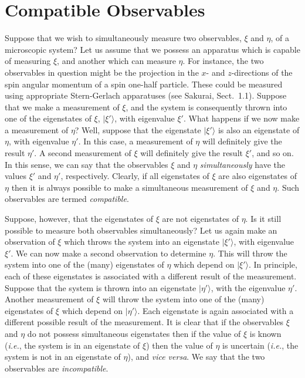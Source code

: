 \section{Compatible Observables}
Suppose that we wish to 
simultaneously measure two observables, $\xi$ and $\eta$, of a
microscopic system? Let us assume that we possess an apparatus which is
capable of measuring $\xi$, and another which can measure $\eta$. For instance,
the two observables in question might be the projection in the
$x$- and $z$-directions of the
spin angular momentum  of a spin one-half particle. These could be measured using
appropriate Stern-Gerlach apparatuses (see Sakurai, Sect.~1.1). 
Suppose that we make a measurement of $\xi$, and the system is 
consequently thrown into
one of the eigenstates of $\xi$, $|\xi'\rangle$, with eigenvalue $\xi'$. What
happens if we now make a measurement of $\eta$?  Well, suppose that
the eigenstate $|\xi'\rangle$ is also an eigenstate of $\eta$, with eigenvalue
$\eta'$. In this case, a measurement of $\eta$ will definitely give the
result $\eta'$. A second measurement of $\xi$ will definitely give the
result $\xi'$, and so on. In this sense, we can say that
the observables $\xi$ and $\eta$
{\em simultaneously} have the values $\xi'$ and $\eta'$, respectively. 
Clearly, if all eigenstates of $\xi$ are also eigenstates of $\eta$ then 
it is always possible to make a simultaneous measurement of $\xi$ and $\eta$.
Such observables are termed {\em compatible}. 

Suppose, however, that the eigenstates of $\xi$ are not eigenstates of $\eta$.
Is it still possible to measure both observables simultaneously? Let us again
make an observation of $\xi$ which throws the system into an eigenstate
$|\xi'\rangle$, with eigenvalue $\xi'$.
 We can now make a second observation to determine $\eta$. 
This will throw the system into one of the (many) eigenstates of $\eta$ which
 depend on $|\xi'\rangle$. In principle, each of these eigenstates is
associated with a different result of the measurement. Suppose that the
system is thrown into an eigenstate $|\eta'\rangle$, with the eigenvalue $\eta'$.
Another measurement of $\xi$ will throw the system into one of the (many)
eigenstates of $\xi$ which depend on $|\eta'\rangle$. 
Each eigenstate is again associated with a different possible
result of the measurement. It is clear that if the observables
$\xi$ and $\eta$ do not possess simultaneous eigenstates then if the value
of $\xi$ is known ({\em i.e.}, the system is in an eigenstate of $\xi$)  then the
value of $\eta$ is uncertain ({\em i.e.}, the system is not in an eigenstate
of $\eta$), and {\em vice versa}. We say that the two observables are 
{\em incompatible}.


